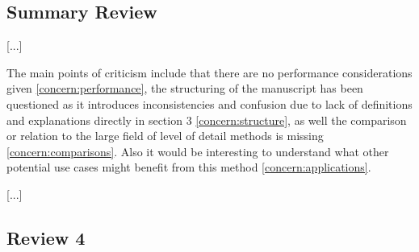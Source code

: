 \documentclass{article}
\begin{document}
\subsection*{Summary Review}

[...]

The main points of criticism include that there are no performance considerations given \eqref{concern:performance}, the structuring of the manuscript has been questioned as it introduces inconsistencies and confusion due to lack of definitions and explanations directly in section 3 \eqref{concern:structure}, as well the comparison or relation to the large field of level of detail methods is missing \eqref{concern:comparisons}.
Also it would be interesting to understand what other potential use cases might benefit from this method \eqref{concern:applications}.

[...]


\subsection*{Review 4}


\end{document}
